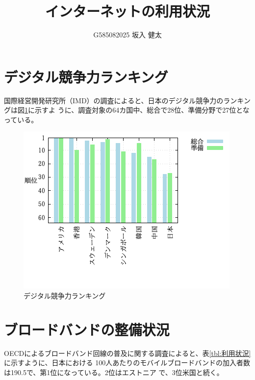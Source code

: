 \documentclass[a4paper,11pt,dvipdfmx]{ujarticle}
\title{インターネットの利用状況}
\author{G585082025 坂入 健太}
\begin{document}
\maketitle %

\section{デジタル競争力ランキング}

国際経営開発研究所（IMD）の調査\cite{imd}によると、日本のデジタル競争力のランキングは図\ref{fig:保有率}に示すよ
うに、調査対象の64カ国中、総合で28位、準備分野で27位となっている。%

\begin{figure}[htbp]
    \centering
    \includegraphics[width=0.7\linewidth]{fig51.png}
\caption{デジタル競争力ランキング}\label{fig:保有率}
\end{figure}%

\section{ブロードバンドの整備状況}

OECDによるブロードバンド回線の普及に関する調査\cite{oecd}によると、表\ref{tbl:利用状況}に示すように、日本における 100人あたりのモバイルブロードバンドの加入者数は190.5で、第1位になっている。2位はエストニア
で、3位米国と続く。
\end{document}
